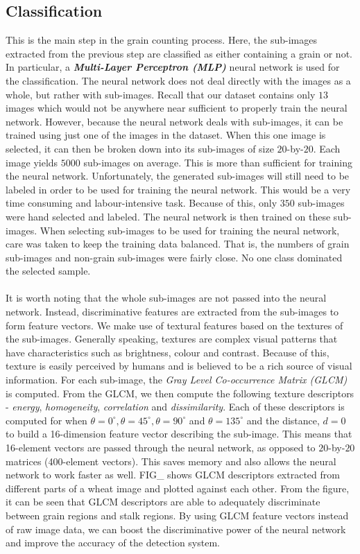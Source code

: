 \subsection{Classification}
This is the main step in the grain counting process. Here, the sub-images extracted from the previous step are classified as either containing a grain or not. In particular, a \textit{\textbf{Multi-Layer Perceptron (MLP)}} neural network is used for the classification. The neural network does not deal directly with the images as a whole, but rather with sub-images. Recall that our dataset contains only $13$ images which would not be anywhere near sufficient to properly train the neural network. However, because the neural network deals with sub-images, it can be trained using just one of the images in the dataset. When this one image is selected, it can then be broken down into its sub-images of size $20$-by-$20$. Each image yields $5000$ sub-images on average. This is more than sufficient for training the neural network. Unfortunately, the generated sub-images will still need to be labeled in order to be used for training the neural network. This would be a very time consuming and labour-intensive task. Because of this, only $350$ sub-images were hand selected and labeled. The neural network is then trained on these sub-images. When selecting sub-images to be used for training the neural network, care was taken to keep the training data balanced. That is, the numbers of grain sub-images and non-grain sub-images were fairly close. No one class dominated the selected sample.\\ \\
%
It is worth noting that the whole sub-images are not passed into the neural network. Instead, discriminative features are extracted from the sub-images to form feature vectors. We make use of textural features based on the textures of the sub-images. Generally speaking, textures are complex visual patterns that have characteristics such as brightness, colour and contrast. Because of this, texture is easily perceived by humans and is believed to be a rich source of
visual information. For each sub-image, the \textit{Gray Level Co-occurrence Matrix (GLCM)} is computed. From the GLCM, we then compute the following texture descriptors - \textit{energy}, \textit{homogeneity}, \textit{correlation} and \textit{dissimilarity}. Each of these descriptors is computed for when $\theta = 0^\circ, \theta = 45^\circ, \theta = 90^\circ$ and $\theta = 135^\circ$ and the distance, $d = 0$ to build a 16-dimension feature vector describing the sub-image. This means that 16-element vectors are passed through the neural network, as opposed to $20$-by-$20$ matrices (400-element vectors). This saves memory and also allows the neural network to work faster as well. FIG\_ shows GLCM descriptors extracted from different parts of a wheat image and plotted against each other. From the figure, it can be seen that GLCM descriptors are able to adequately discriminate between grain regions and stalk regions. By using GLCM feature vectors instead of raw image data, we can boost the discriminative power of the neural network and improve the accuracy of the detection system.

